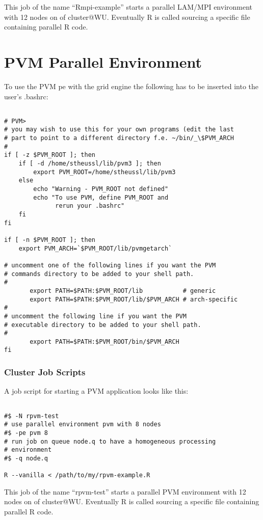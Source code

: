This job of the name ``Rmpi-example'' starts a parallel LAM/MPI environment
with 12 nodes on  of cluster@WU. Eventually R is
called sourcing a specific file containing parallel R code.

\section{PVM Parallel Environment}

To use the PVM pe with the grid engine the following has to be
inserted into the user's .bashrc:

\begin{verbatim}

# PVM>
# you may wish to use this for your own programs (edit the last
# part to point to a different directory f.e. ~/bin/_\$PVM_ARCH
#
if [ -z $PVM_ROOT ]; then
    if [ -d /home/stheussl/lib/pvm3 ]; then
        export PVM_ROOT=/home/stheussl/lib/pvm3
    else
        echo "Warning - PVM_ROOT not defined"
        echo "To use PVM, define PVM_ROOT and 
              rerun your .bashrc"
    fi
fi

if [ -n $PVM_ROOT ]; then
    export PVM_ARCH=`$PVM_ROOT/lib/pvmgetarch`

# uncomment one of the following lines if you want the PVM
# commands directory to be added to your shell path.
#
       export PATH=$PATH:$PVM_ROOT/lib           # generic
       export PATH=$PATH:$PVM_ROOT/lib/$PVM_ARCH # arch-specific
#
# uncomment the following line if you want the PVM
# executable directory to be added to your shell path.
#
       export PATH=$PATH:$PVM_ROOT/bin/$PVM_ARCH
fi

\end{verbatim}


\subsubsection{Cluster Job Scripts}

A job script for starting a PVM application looks like this:

\begin{verbatim}

#$ -N rpvm-test
# use parallel environment pvm with 8 nodes
#$ -pe pvm 8 
# run job on queue node.q to have a homogeneous processing
# environment 
#$ -q node.q

R --vanilla < /path/to/my/rpvm-example.R

\end{verbatim}

This job of the name ``rpvm-test'' starts a parallel PVM environment 
with 12 nodes on  of cluster@WU. Eventually R is
called sourcing a specific file containing parallel R code.

